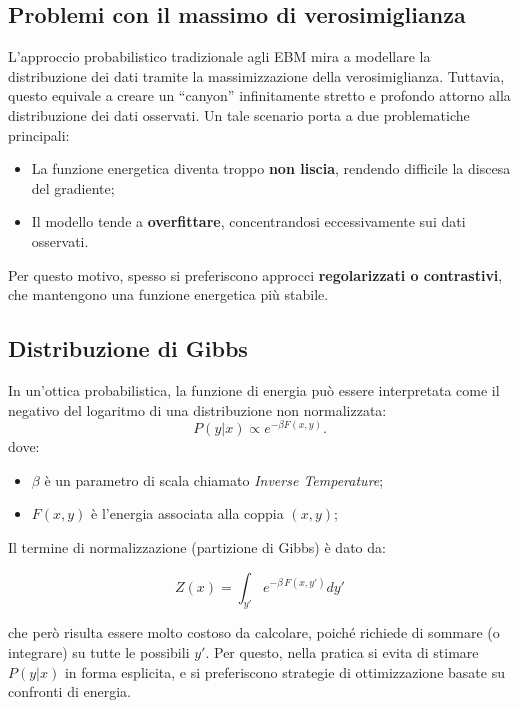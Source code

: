 \subsection{Problemi con il massimo di verosimiglianza}
L’approccio probabilistico tradizionale agli EBM mira a modellare la distribuzione dei dati tramite la massimizzazione della verosimiglianza. Tuttavia, questo equivale a creare un “canyon” infinitamente stretto e profondo attorno alla distribuzione dei dati osservati. Un tale scenario porta a due problematiche principali:
\begin{itemize}
    \item La funzione energetica diventa troppo \textbf{non liscia}, rendendo difficile la discesa del gradiente;
    \item Il modello tende a \textbf{overfittare}, concentrandosi eccessivamente sui dati osservati.
\end{itemize}

Per questo motivo, spesso si preferiscono approcci \textbf{regolarizzati o contrastivi}, che mantengono una funzione energetica più stabile.

\subsection{Distribuzione di Gibbs}
In un’ottica probabilistica, la funzione di energia può essere interpretata come il negativo del logaritmo di una distribuzione non normalizzata:
\begin{equation*}
    P(y|x) \propto e^{-\beta F(x, y)}.
\end{equation*}
dove:
\begin{itemize}
    \item $\beta$ è un parametro di scala chiamato \textit{Inverse Temperature};
    \item $F(x,y)$ è l'energia associata alla coppia $(x,y)$;
\end{itemize}

Il termine di normalizzazione (partizione di Gibbs) è dato da:

\begin{equation}
    Z(x)=\int_{y'}e^{-\beta\,F(x,y')}dy'
\end{equation}

che però risulta essere molto costoso da calcolare, poiché richiede di sommare (o integrare) su tutte le possibili $y'$.
Per questo, nella pratica si evita di stimare $P(y|x)$ in forma esplicita, e si preferiscono strategie di ottimizzazione basate su confronti di energia.
